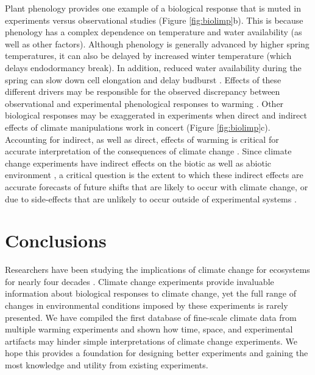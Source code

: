 \documentclass{article}
\begin{document}
\par Plant phenology provides one example of a biological response that is muted in experiments versus observational studies (Figure \ref{fig:biolimp}b). This is because phenology has a complex dependence on temperature and water availability (as well as other factors). Although phenology is generally advanced by higher spring temperatures, it can also be delayed by increased winter temperature (which delays endodormancy break). In addition, reduced water availability during the spring can slow down cell elongation and delay budburst \citep{penuelas2004,ourcival2011,craine2012,matthews2016}.
Effects of these different drivers may be responsible for the observed discrepancy between observational and experimental phenological responses to warming \citep{wolkovich2012}. Other biological responses may be exaggerated in experiments when direct and indirect effects of climate manipulations work in concert (Figure \ref{fig:biolimp}c). Accounting for indirect, as well as direct, effects of warming is critical for accurate interpretation of the consequences of climate change \citep{kharouba2015}. Since climate change experiments have indirect effects on the biotic as well as abiotic environment \citep{hoeppner2012,pelini2014,diamond2016}, a critical question is the extent to which these indirect effects are accurate forecasts of future shifts that are likely to occur with climate change, or due to side-effects that are unlikely to occur outside of experimental systems \citep{moise2010,diamond2013}.
\section* {Conclusions}
 \par Researchers have been studying the implications of climate change for ecosystems for nearly four decades \citep[e.g.,][]{tamaki1981,carlson1982}. Climate change experiments provide invaluable information about biological responses to climate change, yet the full range of changes in environmental conditions imposed by these experiments is rarely presented. We have compiled the first database of fine-scale climate data from multiple warming experiments and shown how time, space, and experimental artifacts may hinder simple interpretations of climate change experiments. We hope this  provides a foundation for designing better experiments and gaining the most knowledge and utility from existing experiments.  
 
\end{document}
